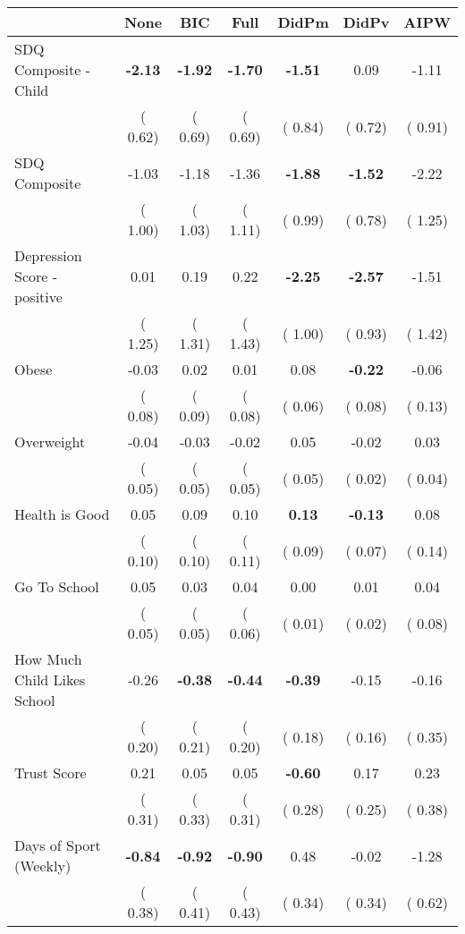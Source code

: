 \begin{tabular}{l c c c c c c}
\toprule
 & None & BIC & Full & DidPm & DidPv & AIPW \\
\midrule
SDQ Composite - Child & \textbf{     -2.13 } & \textbf{     -1.92 } & \textbf{     -1.70 } & \textbf{     -1.51 } &      0.09 &     -1.11 \\
& (     0.62) & (     0.69) & (     0.69) & (     0.84) & (     0.72) & (     0.91) \\
SDQ Composite &     -1.03 &     -1.18 &     -1.36 & \textbf{     -1.88 } & \textbf{     -1.52 } &     -2.22 \\
& (     1.00) & (     1.03) & (     1.11) & (     0.99) & (     0.78) & (     1.25) \\
Depression Score - positive &      0.01 &      0.19 &      0.22 & \textbf{     -2.25 } & \textbf{     -2.57 } &     -1.51 \\
& (     1.25) & (     1.31) & (     1.43) & (     1.00) & (     0.93) & (     1.42) \\
Obese &     -0.03 &      0.02 &      0.01 &      0.08 & \textbf{     -0.22 } &     -0.06 \\
& (     0.08) & (     0.09) & (     0.08) & (     0.06) & (     0.08) & (     0.13) \\
Overweight &     -0.04 &     -0.03 &     -0.02 &      0.05 &     -0.02 &      0.03 \\
& (     0.05) & (     0.05) & (     0.05) & (     0.05) & (     0.02) & (     0.04) \\
Health is Good &      0.05 &      0.09 &      0.10 & \textbf{      0.13 } & \textbf{     -0.13 } &      0.08 \\
& (     0.10) & (     0.10) & (     0.11) & (     0.09) & (     0.07) & (     0.14) \\
Go To School &      0.05 &      0.03 &      0.04 &      0.00 &      0.01 &      0.04 \\
& (     0.05) & (     0.05) & (     0.06) & (     0.01) & (     0.02) & (     0.08) \\
How Much Child Likes School &     -0.26 & \textbf{     -0.38 } & \textbf{     -0.44 } & \textbf{     -0.39 } &     -0.15 &     -0.16 \\
& (     0.20) & (     0.21) & (     0.20) & (     0.18) & (     0.16) & (     0.35) \\
Trust Score &      0.21 &      0.05 &      0.05 & \textbf{     -0.60 } &      0.17 &      0.23 \\
& (     0.31) & (     0.33) & (     0.31) & (     0.28) & (     0.25) & (     0.38) \\
Days of Sport (Weekly) & \textbf{     -0.84 } & \textbf{     -0.92 } & \textbf{     -0.90 } &      0.48 &     -0.02 &     -1.28 \\
& (     0.38) & (     0.41) & (     0.43) & (     0.34) & (     0.34) & (     0.62) \\
\bottomrule
\end{tabular}
